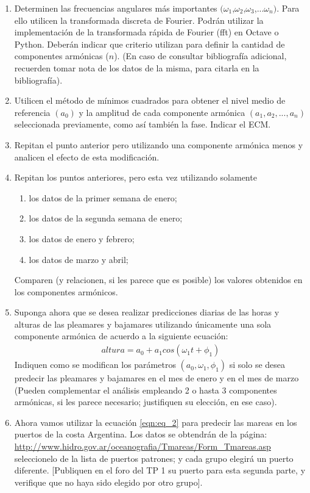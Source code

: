 \documentclass[10pt,a4paper]{article}
\numberwithin{equation}{section}
\numberwithin{figure}{section}
\numberwithin{table}{section}
\begin{document}
\begin{enumerate}
    \item 
    Determinen las frecuencias angulares más importantes $(\omega_1$,$\omega_2$,$\omega_3$,...$\omega_n)$. Para ello utilicen la transformada discreta de Fourier. Podrán utilizar la implementación de la transformada rápida de Fourier (fft) en Octave o Python. Deberán indicar que criterio utilizan para definir la cantidad de componentes armónicas ($n$). (En caso de consultar bibliografía adicional, recuerden tomar nota de los datos de la misma, para citarla en la bibliografía).
    \item
    Utilicen el método de mínimos cuadrados para obtener el nivel medio de referencia $(a_0)$ y la amplitud de cada componente armónica $(a_1,a_2,...,a_n)$ seleccionada previamente, como así también la fase. Indicar el ECM.
    \item
    Repitan el punto anterior pero utilizando una componente armónica menos y analicen el efecto de esta modificación.
    \item
    Repitan los puntos anteriores, pero esta vez utilizando solamente 
    \begin{enumerate}
        \item
        los datos de la primer semana de enero;
        \item
        los datos de la segunda semana de enero;
        \item
        los datos de enero y febrero;
        \item
        los datos de marzo y abril;
    \end{enumerate}
    Comparen (y relacionen, si les parece que es posible) los valores obtenidos en los componentes armónicos.
    \item
    Suponga ahora que se desea realizar predicciones diarias de las horas y alturas de las pleamares y bajamares utilizando únicamente una sola componente armónica de acuerdo a la siguiente ecuación:
    \begin{equation}\label{eqn:eq_2}
        \begin{split}
            altura = a_0 + a_1 cos(\omega_1 t + \phi_1)
        \end{split}
    \end{equation}
    Indiquen como se modifican los parámetros $(a_0,\omega_1,\phi_1)$ si solo se desea predecir las pleamares y bajamares en el mes de enero y en el mes de marzo
    (Pueden complementar el análisis empleando 2 o hasta 3 componentes armónicas, si les parece necesario; justifiquen su elección, en ese caso).
    \item
    Ahora vamos utilizar la ecuación \ref{eqn:eq_2} para predecir las mareas en los puertos de la costa Argentina.
    Los datos se obtendrán de la página:
    \url{http://www.hidro.gov.ar/oceanografia/Tmareas/Form_Tmareas.asp} seleccionelo de la lista de puertos patrones; y cada grupo elegirá un puerto diferente. [Publiquen en el foro del TP 1 su puerto para esta segunda parte, y verifique que no haya sido elegido por otro grupo].
    

\end{enumerate}
\end{document}
